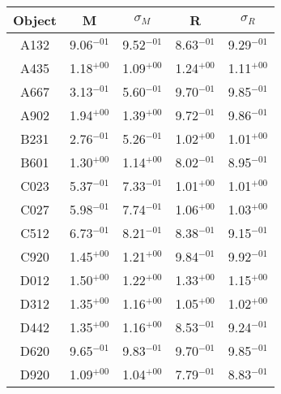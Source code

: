 \small
\vspace{-1cm}
\begin{tabular}{ccccc}
\hline
Object & M & $\sigma_{M}$ & R & $\sigma_{R}$ \\
\hline
A132 & 9.06$^{-01}$ & 9.52$^{-01}$ & 8.63$^{-01}$ & 9.29$^{-01}$ \\
A435 & 1.18$^{+00}$ & 1.09$^{+00}$ & 1.24$^{+00}$ & 1.11$^{+00}$ \\
A667 & 3.13$^{-01}$ & 5.60$^{-01}$ & 9.70$^{-01}$ & 9.85$^{-01}$ \\
A902 & 1.94$^{+00}$ & 1.39$^{+00}$ & 9.72$^{-01}$ & 9.86$^{-01}$ \\
B231 & 2.76$^{-01}$ & 5.26$^{-01}$ & 1.02$^{+00}$ & 1.01$^{+00}$ \\
B601 & 1.30$^{+00}$ & 1.14$^{+00}$ & 8.02$^{-01}$ & 8.95$^{-01}$ \\
C023 & 5.37$^{-01}$ & 7.33$^{-01}$ & 1.01$^{+00}$ & 1.01$^{+00}$ \\
C027 & 5.98$^{-01}$ & 7.74$^{-01}$ & 1.06$^{+00}$ & 1.03$^{+00}$ \\
C512 & 6.73$^{-01}$ & 8.21$^{-01}$ & 8.38$^{-01}$ & 9.15$^{-01}$ \\
C920 & 1.45$^{+00}$ & 1.21$^{+00}$ & 9.84$^{-01}$ & 9.92$^{-01}$ \\
D012 & 1.50$^{+00}$ & 1.22$^{+00}$ & 1.33$^{+00}$ & 1.15$^{+00}$ \\
D312 & 1.35$^{+00}$ & 1.16$^{+00}$ & 1.05$^{+00}$ & 1.02$^{+00}$ \\
D442 & 1.35$^{+00}$ & 1.16$^{+00}$ & 8.53$^{-01}$ & 9.24$^{-01}$ \\
D620 & 9.65$^{-01}$ & 9.83$^{-01}$ & 9.70$^{-01}$ & 9.85$^{-01}$ \\
D920 & 1.09$^{+00}$ & 1.04$^{+00}$ & 7.79$^{-01}$ & 8.83$^{-01}$ \\
\hline

\end{tabular}
